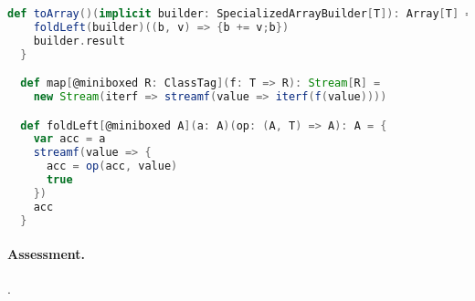 \begin{lstlisting}[language=scala, caption=Sample operators.]
  def toArray()(implicit builder: SpecializedArrayBuilder[T]): Array[T] = {
    foldLeft(builder)((b, v) => {b += v;b})
    builder.result
  }

  def map[@miniboxed R: ClassTag](f: T => R): Stream[R] = 
    new Stream(iterf => streamf(value => iterf(f(value))))

  def foldLeft[@miniboxed A](a: A)(op: (A, T) => A): A = {
    var acc = a
    streamf(value => {
      acc = op(acc, value)
      true
    })
    acc
  }
\end{lstlisting}

\paragraph{Assessment. } .
